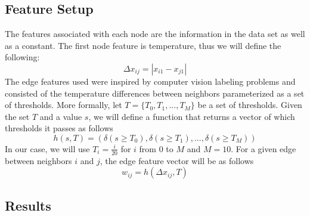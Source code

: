 \subsection{Feature Setup}

The features associated with each node are the information in the data set as well as a constant. The first node feature is temperature, thus we will define the following:
\[
\Delta x_{ij} = |x_{i1} - x_{j1}|
\]
The edge features used were inspired by computer vision labeling problems and consisted of the temperature differences between neighbors parameterized as a set of thresholds. More formally, let $T = \{ T_0 , T_1, ..., T_M \}$ be a set of thresholds. Given the set $T$ and a value $s$, we will define a function that returns a vector of which thresholds it passes as follows
\[
h(s,T) = ( \delta (s \geq T_0), \delta (s \geq T_1), ..., \delta (s \geq T_M))
\]
In our case, we will use $T_i = \frac{i}{20}$ for $i$ from $0$ to $M$ and $M=10$. For a given edge between neighbors $i$ and $j$, the edge feature vector will be as follows
\[
w_{ij} = h( \Delta x_{ij}, T)
\] 

\subsection{Results}

